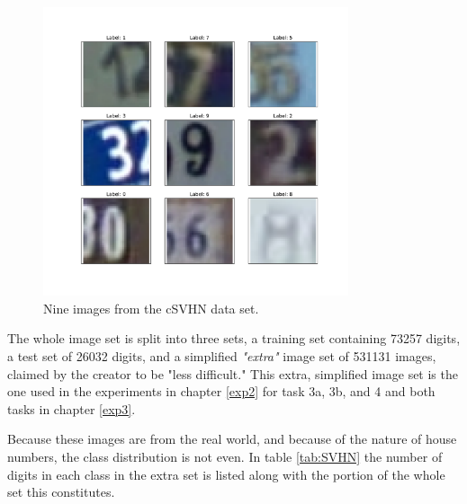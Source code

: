 \begin{figure}[p!]
    \centering
    \includegraphics[width=0.8\textwidth]{Chapters/3.Implementation/figures/cSVHN.pdf}
    \caption[cSVHN example]{Nine images from the cSVHN data set.}
    \label{fig:csvhn}
\end{figure}

The whole image set is split into three sets, a training set containing 73257 digits, a test set of 26032 digits, and a simplified \textit{"extra"} image set of 531131 images, claimed by the creator to be "less difficult." This extra, simplified image set is the one used in the experiments in chapter \ref{exp2} for task 3a, 3b, and 4 and both tasks in chapter \ref{exp3}.



Because these images are from the real world, and because of the nature of house numbers, the class distribution is not even. In table \ref{tab:SVHN} the number of digits in each class in the extra set is listed along with the portion of the whole set this constitutes.  

